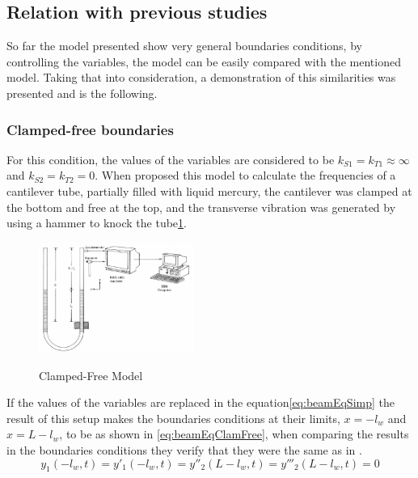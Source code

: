 \subsection{Relation with previous studies}
So far the model presented show very general boundaries conditions, by controlling the variables, the model can be easily compared with the mentioned model. Taking that into consideration, a demonstration of this similarities was presented and is the following.
    \subsubsection{Clamped-free boundaries}
    For this condition, the values of the variables are considered to be $k_{S1}=k_{T1}\approx\infty$ and $k_{S2}=k_{T2}=0$. When \citeauthor{chanFreeVibrationCantilever1995} proposed this model to calculate the frequencies of a cantilever tube, partially filled with liquid mercury, the cantilever was clamped at the bottom and free at the top, and the transverse vibration was generated by using a hammer to knock the tube\ref{fig:clampedfreemodel}. 
    \begin{figure}[!htb]
        \centering
        \includegraphics[width=0.45\textwidth]{Chapters/2CHP/Diagrams/clampedfreemodel.pdf}
        \caption{Clamped-Free Model}{\cite{chanFreeVibrationCantilever1995}}
        \label{fig:clampedfreemodel}
    \end{figure}
    If the values of the variables are replaced in the equation\ref{eq:beamEqSimp} the result of this setup makes the boundaries conditions at their limits, $x=-l_w$ and $x=L-l_w$, to be as shown in \ref{eq:beamEqClamFree}, when comparing the results in the boundaries conditions they verify that they were the same as in \cite{chanFreeVibrationCantilever1995}.
    \begin{equation} \label{eq:beamEqClamFree}
            y_1(-l_w,t) = y'_1(-l_w,t) = y''_2(L-l_w,t) = y'''_2(L-l_w,t)=0
    \end{equation}

